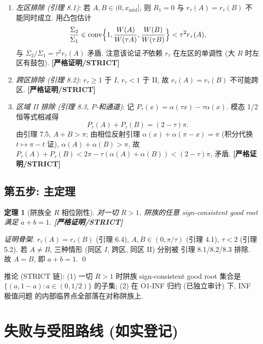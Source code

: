 \documentclass[UTF8]{ctexart}
\newtheorem{theorem}{定理}[section]
\newcommand{\STRICT}{\textbf{[严格证明/STRICT]}}
\begin{document}
\begin{enumerate}
	\item \emph{左区排除 (引理 8.1)}: 若 $A,B\in(0,x_{\mathrm{mid}}]$, 则
		$R_1=0$ 与 $r_\tau(A)=r_\tau(B)$ 不能同时成立. 用凸包估计
		\begin{equation}
			\frac{\Sigma_2}{\Sigma_1}
			\in\operatorname{conv}\Bigl\{1,\frac{W(A)}{W(\tau A)},\frac{W(B)}{W(\tau B)}\Bigr\}
			<\tau^2r_\tau(A),
		\end{equation}
		与 $\Sigma_2/\Sigma_1=\tau^2r_\tau(A)$ 矛盾. 注意该论证\emph{不}依赖
		$r_\tau$ 在左区的单调性 (大 $R$ 时左区有鼓包). \STRICT{}
	\item \emph{跨区排除 (引理 8.2)}: $r_\tau\ge1$ 于 $I$, $r_\tau<1$ 于 II,
		故 $r_\tau(A)=r_\tau(B)$ 不可能跨区. \STRICT{}
	\item \emph{区域 II 排除 (引理 8.3, $P$-和通道)}: 记
		$P_\tau(x)=\alpha(\tau x)-\tau\alpha(x)$. 模态 1/2 恒等式相减得
		\begin{equation}
			P_\tau(A)+P_\tau(B)=(2-\tau)\pi.
		\end{equation}
		由引理 7.5, $A+B>\pi$; 由相位反射引理 $\alpha(x)+\alpha(\pi-x)=\pi$
		(积分代换 $t\mapsto\pi-t$ 证), $\alpha(A)+\alpha(B)>\pi$, 故
		$P_\tau(A)+P_\tau(B)<2\pi-\tau(\alpha(A)+\alpha(B))<(2-\tau)\pi$, 矛盾.
		\STRICT{}
\end{enumerate}

\subsection{第五步: 主定理}

\begin{theorem}[阱族全 $R$ 相位刚性]\label{thm:main}
	对一切 $R>1$, 阱族的任意 sign-consistent good root 满足 $a+b=1$. \STRICT{}
\end{theorem}

\begin{proof}[证明骨架]
	$r_\tau(A)=r_\tau(B)$ (引理 6.4), $A,B\in(0,\pi/\tau)$ (引理 4.1),
	$\tau<2$ (引理 5.2). 若 $A\ne B$, 三种情形 (同区 $I$, 跨区, 同区 II) 分别被
	引理 8.1/8.2/8.3 排除. 故 $A=B$, 即 $a+b=1$. \qed
\end{proof}

推论 (STRICT 链): (1) 一切 $R>1$ 时阱族 sign-consistent good root 集合是
$\{(a,1-a):a\in(0,1/2)\}$ 的子集; (2) 在 O1-INF 归约 (已独立审计) 下, INF 极值问题
的内部临界点全部落在对称阱族上.

\section{失败与受阻路线 (如实登记)}\label{sec:failed}
\end{document}

